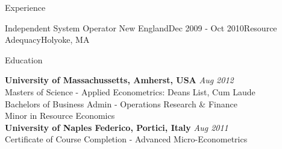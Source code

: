 \documentclass{resume} %
\begin{document}
\begin{rSection}{Experience}
\begin{rSubsection}{Independent System Operator New England}{Dec 2009 - Oct 2010}{Resource Adequacy}{Holyoke, MA}
\end{rSubsection}


%
\end{rSection}


\begin{rSection}{Education}

{\bf University of Massachussetts, Amherst, USA} \hfill {\em Aug 2012} \\
Masters of Science -  Applied Econometrics: Deans List, Cum Laude \\
Bachelors of Business Admin - Operations Research \& Finance \\
Minor in Resource Economics \\

{\bf University of Naples Federico, Portici, Italy} \hfill {\em Aug 2011} \\
Certificate of Course Completion - Advanced Micro-Econometrics \\

\end{rSection}

\end{document}
